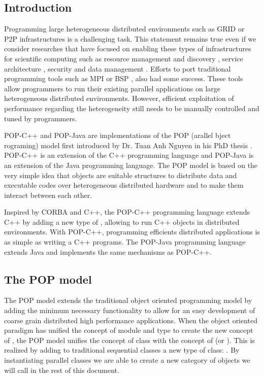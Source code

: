 \subsection{Introduction}
Programming large heterogeneous distributed environments such as GRID or P2P
infrastructures is a challenging task. This statement remains true even if
we consider researches that have focused on enabling these types of
infrastructures for scientific computing such as resource management and
discovery \cite{Foster97, Grimshaw99, Czajkowski98}, service architecture
\cite{Foster02}, security \cite{Welch03} and data management
\cite{Allcock02, Stockinger01}.
Efforts to port traditional programming tools such as MPI
\cite{Foster98:2, Roy00, Karonis03} or BSP \cite{Tong03, Williams00},
also had some success. These tools allow programmers to run their existing
parallel applications on large heterogeneous distributed environments. However,
efficient exploitation of performance regarding the heterogeneity still
needs to be manually controlled and tuned by programmers.\s

POP-C++ and POP-Java are implementations of the POP (arallel bject
rograming) model first introduced by Dr. Tuan Anh Nguyen in
his PhD thesis \cite{Nguyen04}. POP-C++ is an extension of the C++ programming language\cite{Nguyen07} and POP-Java is an extension of the Java programming language\cite{popjava_tech}. The POP model is based on the very simple
idea that objects are suitable structures to distribute data and executable
codes over heterogeneous distributed hardware and to make them interact
between each other.

Inspired by CORBA \cite{corba26} and C++, the POP-C++ programming
language extends C++ by adding a new type of ,
allowing to run C++ objects in distributed environments. With POP-C++,
programming efficients distributed applications is as simple as writing
a C++ programs. The POP-Java programming language extends Java and implements the same mechanisms as POP-C++.

\subsection{The POP model}
The POP model extends the traditional object oriented programming model
by adding the minimum necessary functionality to allow for an easy development
of coarse grain distributed high performance applications.
When the object oriented paradigm has unified the concept of module and type to
create the new concept of , the POP model unifies the concept
of class with the concept of  (or ). This
is realized by adding to traditional sequential classes a new type of class:
. By instantiating parallel classes we are able
to create a new category of objects we will call 
in the rest of this document.\s

